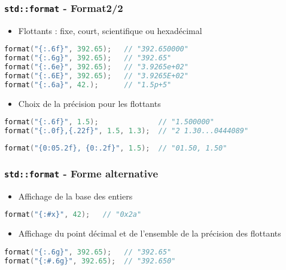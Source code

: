 \documentclass[C++.tex]{subfiles}
\begin{document}
\begin{frame}[fragile]
	\frametitle{\lstinline|std::format| - Format\titlehfill{}2/2}
	\begin{itemize}
		\item Flottants : fixe, \og court\fg{}, scientifique ou hexadécimal
	\end{itemize}

	\begin{lstlisting}[language=C++]
format("{:.6f}", 392.65);   // "392.650000"
format("{:.6g}", 392.65);   // "392.65"
format("{:.6e}", 392.65);   // "3.9265e+02"
format("{:.6E}", 392.65);   // "3.9265E+02"
format("{:.6a}", 42.);    	// "1.5p+5"\end{lstlisting}


	\begin{itemize}
		\item Choix de la précision pour les flottants
	\end{itemize}

	\begin{lstlisting}[language=C++]
format("{:.6f}", 1.5);              // "1.500000"
format("{:.0f},{.22f}", 1.5, 1.3);  // "2 1.30...0444089"\end{lstlisting}

	\begin{lstlisting}[language=C++]
format("{0:05.2f}, {0:.2f}", 1.5);  // "01.50, 1.50"\end{lstlisting}
\end{frame}

\begin{frame}[fragile]
	\frametitle{\lstinline|std::format| - Forme alternative}
	\begin{itemize}
		\item Affichage de la base des entiers
	\end{itemize}

	\begin{lstlisting}[language=C++]
format("{:#x}", 42);   // "0x2a"\end{lstlisting}

	\begin{itemize}
		\item Affichage du point décimal et de l'ensemble de la précision des flottants
	\end{itemize}

	\begin{lstlisting}[language=C++]
format("{:.6g}", 392.65);   // "392.65"
format("{:#.6g}", 392.65);  // "392.650"\end{lstlisting}
\end{frame}
\end{document}

